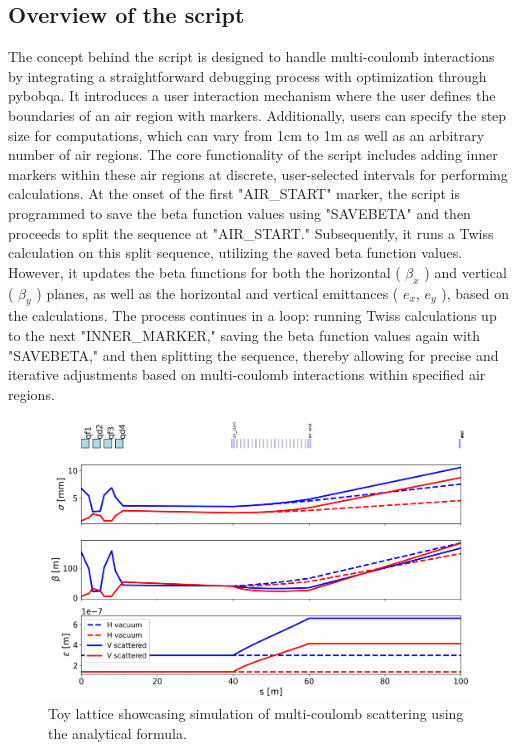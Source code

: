\documentclass[a4paper,
               biblatex,     %
               ]{jacow}
\begin{document}
\subsection{Overview of the script}

The concept behind the script is designed to handle multi-coulomb interactions by integrating a straightforward debugging process with optimization through pybobqa. It introduces a user interaction mechanism where the user defines the boundaries of an air region with markers. Additionally, users can specify the step size for computations, which can vary from 1cm to 1m as well as an arbitrary number of air regions. The core functionality of the script includes adding inner markers within these air regions at discrete, user-selected intervals for performing calculations. At the onset of the first "AIR\_START" marker, the script is programmed to save the beta function values using "SAVEBETA" and then proceeds to split the sequence at "AIR\_START." Subsequently, it runs a Twiss calculation on this split sequence, utilizing the saved beta function values. However, it updates the beta functions for both the horizontal ( $\beta_{x}$ ) and vertical ( $\beta_{y}$ ) planes, as well as the horizontal and vertical emittances ( $e_{x}$, $e_{y}$ ), based on the calculations. The process continues in a loop: running Twiss calculations up to the next "INNER\_MARKER," saving the beta function values again with "SAVEBETA," and then splitting the sequence, thereby allowing for precise and iterative adjustments based on multi-coulomb interactions within specified air regions.

\begin{figure}[!htb]
   \centering
   \includegraphics*[width=1.0\columnwidth]{air_scattering.png}
   \caption{Toy lattice showcasing simulation of multi-coulomb scattering using the analytical formula.}
   \label{fig:simple_line}
\end{figure}
\end{document}
